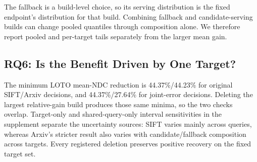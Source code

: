 The fallback is a build-level choice, so its serving distribution is the fixed endpoint's distribution for that build. Combining fallback and candidate-serving builds can change pooled quantiles through composition alone. We therefore report pooled and per-target tails separately from the larger mean gain.

\subsection{RQ6: Is the Benefit Driven by One Target?}
The minimum LOTO mean-NDC reduction is 44.37\%/44.23\% for original SIFT/Arxiv decisions, and 44.37\%/27.64\% for joint-error decisions. Deleting the largest relative-gain build produces those same minima, so the two checks overlap. Target-only and shared-query-only interval sensitivities in the supplement separate the uncertainty sources: SIFT varies mainly across queries, whereas Arxiv's stricter result also varies with candidate/fallback composition across targets. Every registered deletion preserves positive recovery on the fixed target set.
